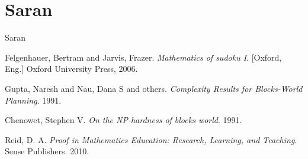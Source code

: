 \documentclass[11pt,a4paper]{report}
\begin{document}
\section{Saran}
Saran

\begin{thebibliography}{9}

\bibitem{}
	Felgenhauer, Bertram and Jarvis, Frazer.
	\emph{Mathematics of sudoku I}.
	[Oxford, Eng.] Oxford University Press,
	2006.

\bibitem{}
	Gupta, Naresh and Nau, Dana S and others.
	\emph{Complexity Results for Blocks-World Planning}.
	1991.

\bibitem{}
	Chenowet, Stephen V.
	\emph{On the NP-hardness of blocks world}.
	1991.
	

\bibitem{}
	Reid, D. A.
	\emph{Proof in Mathematics Education: Research, Learning, and Teaching}.
	Sense Publishers.
	2010.

\end{thebibliography}
\end{document}
